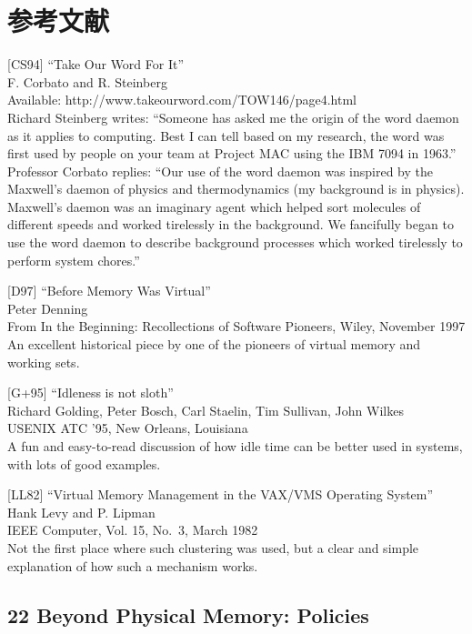 \hypertarget{ux53c2ux8003ux6587ux732e-13}{%
\section*{参考文献}\label{ux53c2ux8003ux6587ux732e-13}}

{[}CS94{]} ``Take Our Word For It''\\
F. Corbato and R. Steinberg\\
Available: http://www.takeourword.com/TOW146/page4.html\\
Richard Steinberg writes: ``Someone has asked me the origin of the word
daemon as it applies to computing. Best I can tell based on my research,
the word was first used by people on your team at Project MAC using the
IBM 7094 in 1963.'' Professor Corbato replies: ``Our use of the word
daemon was inspired by the Maxwell's daemon of physics and
thermodynamics (my background is in physics). Maxwell's daemon was an
imaginary agent which helped sort molecules of different speeds and
worked tirelessly in the background. We fancifully began to use the word
daemon to describe background processes which worked tirelessly to
perform system chores.''

{[}D97{]} ``Before Memory Was Virtual''\\
Peter Denning\\
From In the Beginning: Recollections of Software Pioneers, Wiley,
November 1997\\
An excellent historical piece by one of the pioneers of virtual memory
and working sets.

{[}G+95{]} ``Idleness is not sloth''\\
Richard Golding, Peter Bosch, Carl Staelin, Tim Sullivan, John Wilkes\\
USENIX ATC '95, New Orleans, Louisiana\\
A fun and easy-to-read discussion of how idle time can be better used in
systems, with lots of good examples.

{[}LL82{]} ``Virtual Memory Management in the VAX/VMS Operating
System''\\
Hank Levy and P. Lipman\\
IEEE Computer, Vol. 15, No.~3, March 1982\\
Not the first place where such clustering was used, but a clear and
simple explanation of how such a mechanism works.

\newpage

\hypertarget{beyond-physical-memory-policies}{%
\subsection*{22 Beyond Physical Memory:
Policies}\label{beyond-physical-memory-policies}}

